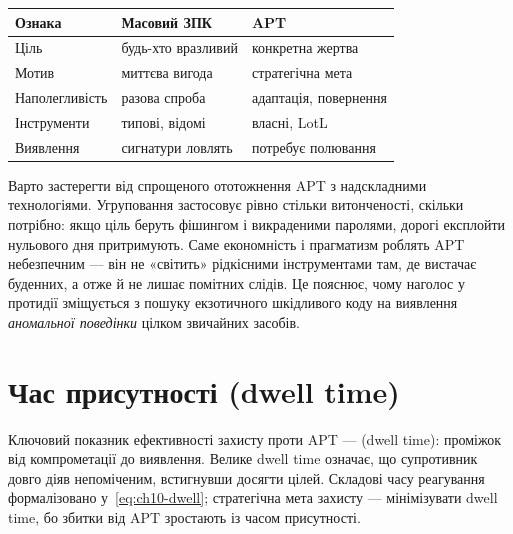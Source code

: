 
\begin{center}\footnotesize
\begin{tabularx}{\linewidth}{L{20mm} Y Y}
\toprule
Ознака & Масовий ЗПК & APT \\
\midrule
Ціль & будь-хто вразливий & конкретна жертва \\
Мотив & миттєва вигода & стратегічна мета \\
Наполегливість & разова спроба & адаптація, повернення \\
Інструменти & типові, відомі & власні, LotL \\
Виявлення & сигнатури ловлять & потребує полювання \\
\bottomrule
\end{tabularx}
\end{center}

Варто застерегти від спрощеного ототожнення APT з надскладними технологіями. Угруповання застосовує рівно стільки витонченості, скільки потрібно: якщо ціль беруть фішингом і викраденими паролями, дорогі експлойти нульового дня притримують. Саме економність і прагматизм роблять APT небезпечним --- він не «світить» рідкісними інструментами там, де вистачає буденних, а отже й не лишає помітних слідів. Це пояснює, чому наголос у протидії зміщується з пошуку екзотичного шкідливого коду на виявлення \emph{аномальної поведінки} цілком звичайних засобів.

\section{Час присутності (dwell time)}\label{sec:ch13-dwell}

Ключовий показник ефективності захисту проти APT ---  (dwell time): проміжок від компрометації до виявлення. Велике dwell time означає, що супротивник довго діяв непоміченим, встигнувши досягти цілей. Складові часу реагування формалізовано у~\eqref{eq:ch10-dwell}; стратегічна мета захисту --- мінімізувати dwell time, бо збитки від APT зростають із часом присутності.

\begin{tikzfig}
\end{tikzfig}

